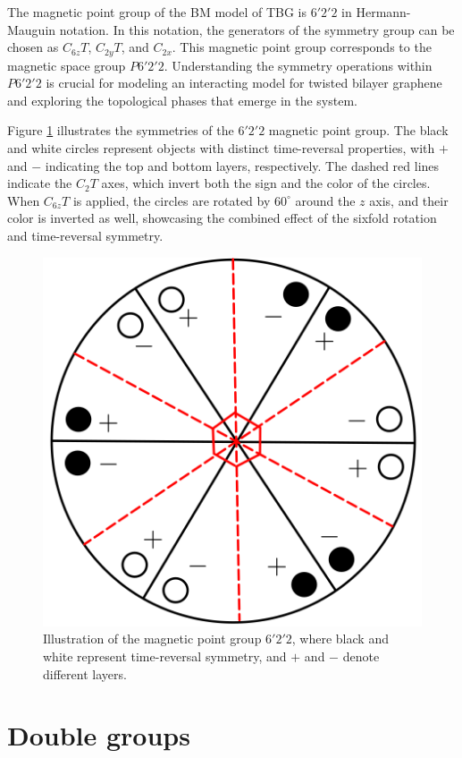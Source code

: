 The magnetic point group of the BM model of TBG is \(6'2'2\) in Hermann-Mauguin notation. In this notation, the generators of the symmetry group can be chosen as \(C_{6z} T\), \(C_{2y} T\), and \(C_{2x}\). This magnetic point group corresponds to the magnetic space group \(P6'2'2\). Understanding the symmetry operations within \(P6'2'2\) is crucial for modeling an interacting model for twisted bilayer graphene and exploring the topological phases that emerge in the system.

Figure \ref{fig:622_magnetic} illustrates the symmetries of the \(6'2'2\) magnetic point group. The black and white circles represent objects with distinct time-reversal properties, with \(+\) and \(-\) indicating the top and bottom layers, respectively. The dashed red lines indicate the \(C_2 T\) axes, which invert both the sign and the color of the circles. When \(C_{6z} T\) is applied, the circles are rotated by \(60^\circ\) around the $z$ axis, and their color is inverted as well, showcasing the combined effect of the sixfold rotation and time-reversal symmetry.


\begin{figure}[H]
\centering
\includegraphics[width=0.5\linewidth]{fig/622_magnetic.png}
\caption{Illustration of the magnetic point group \(6'2'2\), where black and white represent time-reversal symmetry, and \(+\) and \(-\) denote different layers.}
\label{fig:622_magnetic}
\end{figure}


\section{Double groups}

